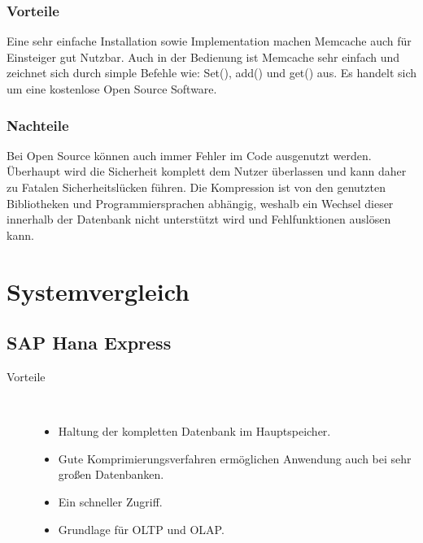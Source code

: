 \documentclass[a4paper, 12pt]{scrartcl}
\begin{document}
\subsubsection{Vorteile}
Eine sehr einfache Installation sowie Implementation machen Memcache auch für Einsteiger gut Nutzbar.
Auch in der Bedienung ist Memcache sehr einfach und zeichnet sich durch simple Befehle wie:
Set(), add() und get() aus.
Es handelt sich um eine kostenlose Open Source Software.

\subsubsection{Nachteile}
Bei Open Source können auch immer Fehler im Code ausgenutzt werden.
Überhaupt wird die Sicherheit komplett dem Nutzer überlassen und kann daher zu Fatalen Sicherheitslücken führen.
Die Kompression ist von den genutzten Bibliotheken und Programmiersprachen abhängig, weshalb ein Wechsel dieser innerhalb der Datenbank nicht unterstützt wird und Fehlfunktionen auslösen kann.

\newpage
\section{Systemvergleich}
\subsection{SAP Hana Express}
\begin{description}
	\item[Vorteile]~\par
	\begin{itemize}
		\item Haltung der kompletten Datenbank im Hauptspeicher. 
		\item Gute Komprimierungsverfahren ermöglichen Anwendung auch bei sehr großen Datenbanken. 

		\item Ein schneller Zugriff.

		\item Grundlage für OLTP und OLAP.
		
	\end{itemize}
\end{description}
\end{document}
